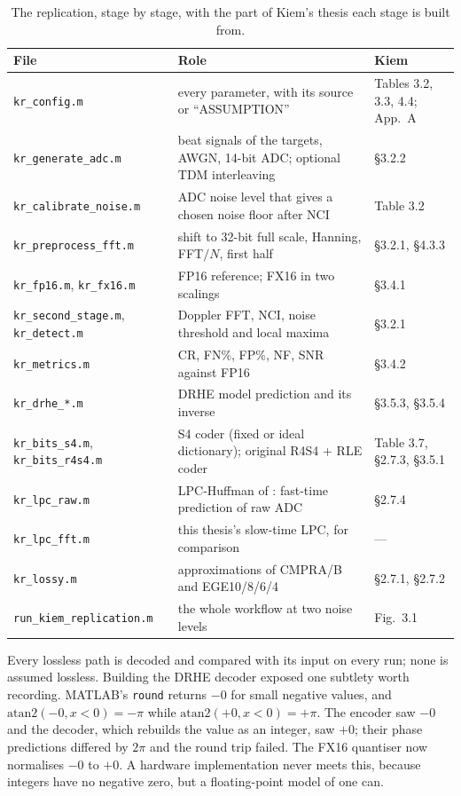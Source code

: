 \begin{table}[htbp]
\centering
\caption[Replication: stages and sources]{The replication, stage by stage,
with the part of Kiem's thesis each stage is built from.}
\label{tab:kr_files}
\small
\begin{tabular}{@{}p{42mm}p{62mm}p{28mm}@{}}
\toprule
File & Role & Kiem\\
\midrule
\texttt{kr\_config.m} & every parameter, with its source or ``ASSUMPTION'' & Tables 3.2, 3.3, 4.4; App.\ A\\
\texttt{kr\_generate\_adc.m} & beat signals of the targets, AWGN, 14-bit ADC; optional TDM interleaving & \S{}3.2.2\\
\texttt{kr\_calibrate\_noise.m} & ADC noise level that gives a chosen noise floor after NCI & Table 3.2\\
\texttt{kr\_preprocess\_fft.m} & shift to 32-bit full scale, Hanning, FFT$/N$, first half & \S{}3.2.1, \S{}4.3.3\\
\texttt{kr\_fp16.m}, \texttt{kr\_fx16.m} & FP16 reference; FX16 in two scalings & \S{}3.4.1\\
\texttt{kr\_second\_stage.m}, \texttt{kr\_detect.m} & Doppler FFT, NCI, noise threshold and local maxima & \S{}3.2.1\\
\texttt{kr\_metrics.m} & CR, FN\%, FP\%, NF, SNR against FP16 & \S{}3.4.2\\
\texttt{kr\_drhe\_*.m} & DRHE model prediction and its inverse & \S{}3.5.3, \S{}3.5.4\\
\texttt{kr\_bits\_s4.m}, \texttt{kr\_bits\_r4s4.m} & S4 coder (fixed or ideal dictionary); original R4S4 + RLE coder & Table 3.7, \S{}2.7.3, \S{}3.5.1\\
\texttt{kr\_lpc\_raw.m} & LPC-Huffman of \cite{meucci2022}: fast-time prediction of raw ADC & \S{}2.7.4\\
\texttt{kr\_lpc\_fft.m} & this thesis's slow-time LPC, for comparison & ---\\
\texttt{kr\_lossy.m} & approximations of CMPRA/B and EGE10/8/6/4 & \S{}2.7.1, \S{}2.7.2\\
\texttt{run\_kiem\_replication.m} & the whole workflow at two noise levels & Fig.\ 3.1\\
\bottomrule
\end{tabular}
\end{table}

\noindent
Every lossless path is decoded and compared with its input on every run; none
is assumed lossless. Building the DRHE decoder exposed one subtlety worth
recording. MATLAB's \texttt{round} returns $-0$ for small negative values, and
$\mathrm{atan2}(-0, x<0) = -\pi$ while $\mathrm{atan2}(+0, x<0) = +\pi$. The
encoder saw $-0$ and the decoder, which rebuilds the value as an integer, saw
$+0$; their phase predictions differed by $2\pi$ and the round trip failed. The
FX16 quantiser now normalises $-0$ to $+0$. A hardware implementation never
meets this, because integers have no negative zero, but a floating-point model
of one can.

